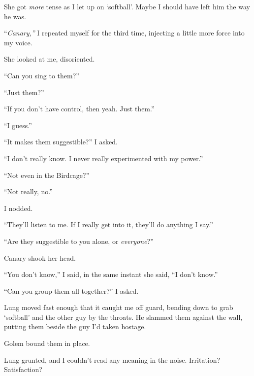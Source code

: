 She got \emph{more} tense as I let up on `softball'.  Maybe I should have left him the way he was.



``\emph{Canary,'' }I repeated myself for the third time, injecting a little more force into my voice.



She looked at me, disoriented.



``Can you sing to them?''



``Just them?''



``If you don't have control, then yeah.  Just them.''



``I guess.''



``It makes them suggestible?''  I asked.



``I don't really know.  I never really experimented with my power.''



``Not even in the Birdcage?''



``Not really, no.''



I nodded.



``They'll listen to me.  If I really get into it, they'll do anything I say.''



``Are they suggestible to you alone, or \emph{everyone}?''



Canary shook her head.



``You don't know,'' I said, in the same instant she said, ``I don't know.''



``Can you group them all together?''  I asked.



Lung moved fast enough that it caught me off guard, bending down to grab `softball' and the other guy by the throats.  He slammed them against the wall, putting them beside the guy I'd taken hostage.



Golem bound them in place.



Lung grunted, and I couldn't read any meaning in the noise.  Irritation?  Satisfaction?



